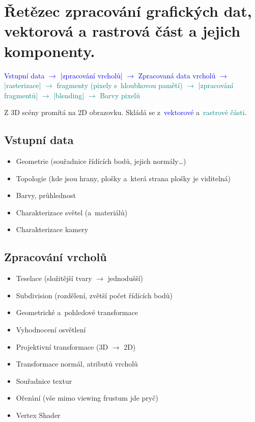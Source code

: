 \section{Řetězec zpracování grafických dat, vektorová a rastrová část a jejich komponenty.}

\textcolor{blue}{Vstupní data \(\rightarrow\) |zpracování vrcholů| \(\rightarrow\) Zpracovaná data vrcholů \(\rightarrow\)} \textcolor{teal}{|rasterizace| \(\rightarrow\) fragmenty (pixely s~hloubkovou pamětí) \(\rightarrow\) |zpracování fragmentů| \(\rightarrow\) |blending| \(\rightarrow\) Barvy pixelů}

Z 3D scény promítá na 2D obrazovku. Skládá se z~\textcolor{blue}{vektorové} a~\textcolor{teal}{rastrové části}.

\subsection{Vstupní data}
\begin{itemize}
    \item Geometrie (souřadnice řídících bodů, jejich normály\dots)
    \item Topologie (kde jsou hrany, plošky a~která strana plošky je viditelná)
    \item Barvy, průhlednost
    \item Charakterizace světel (a~materiálů)
    \item Charakterizace kamery
\end{itemize}

\subsection{Zpracování vrcholů}
\begin{itemize}
    \item Teselace (složitější tvary \(\rightarrow\) jednodušší)
    \item Subdivision (rozdělení, zvětší počet řídících bodů)
    \item Geometrické a~pohledové transformace
    \item Vyhodnocení osvětlení
    \item Projektivní transformace (3D \(\rightarrow\) 2D)
    \item Transformace normál, atributů vrcholů
    \item Souřadnice textur
    \item Ořezání (vše mimo viewing frustum jde pryč)
    \item Vertex Shader
\end{itemize}

